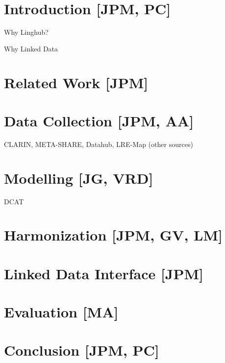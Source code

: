 \documentclass[smallextended]{svjour3}       %
\begin{document}
\begin{abstract}
\end{abstract}

\section{Introduction [JPM, PC]}

Why Linghub?

Why Linked Data

\section{Related Work [JPM]}

\section{Data Collection [JPM, AA]}

CLARIN, META-SHARE, Datahub, LRE-Map (other sources)

\section{Modelling [JG, VRD]}

DCAT

\section{Harmonization [JPM, GV, LM]}

\section{Linked Data Interface [JPM]}

\section{Evaluation [MA]}

\section{Conclusion [JPM, PC]}

\end{document}
